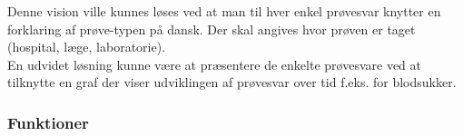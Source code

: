  Denne vision ville kunnes løses ved at man til hver enkel prøvesvar knytter en forklaring af prøve-typen på dansk. Der skal angives hvor prøven er taget (hospital, læge, laboratorie).\\
 En udvidet løsning kunne være at præsentere de enkelte prøvesvare ved at tilknytte en graf der viser udviklingen af prøvesvar over tid f.eks. for blodsukker.\\
 \subsubsection{Funktioner}
